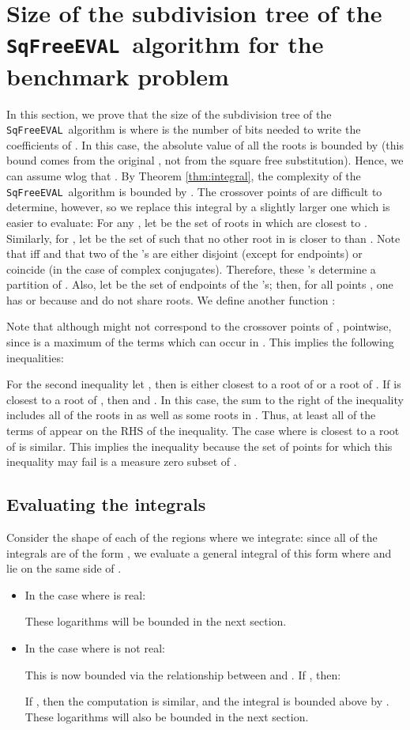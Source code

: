 \documentclass{amsart}
\theoremstyle{definition}
\newcommand{\EVAL}{\texttt{SqFreeEVAL}}
\begin{document}
\section{Size of the subdivision tree of the \EVAL\ algorithm for the benchmark problem}\label{Sec:Analysis}
In this section, we prove that the size of the subdivision tree of the \EVAL\ algorithm is  where  is the number of bits needed to write the coefficients of .  In this case, the absolute value of all the roots is bounded by  \citep{yap:algebra:bk} (this bound comes from the original , not from the square free substitution).  Hence, we can assume wlog that .  By Theorem \ref{thm:integral}, the complexity of the \EVAL\ algorithm is bounded by .  The crossover points of  are difficult to determine, however, so we replace this integral by a slightly larger one which is easier to evaluate: For any , let  be the set of roots in  which are closest to .  Similarly, for , let  be the set of  such that no other root in  is closer to  than .  Note that  iff  and that two of the 's are either disjoint (except for endpoints) or coincide (in the case of complex conjugates).  Therefore, these 's determine a partition of .  Also, let  be the set of endpoints of the 's; then, for all points , one has  or  because  and  do not share roots.  We define another function :

Note that although  might not correspond to the crossover points of , pointwise,  since  is a maximum of the terms which can occur in .  This implies the following inequalities:

For the second inequality let , then  is either closest to a root of  or a root of . If  is closest to a root of , then  and .  In this case, the sum to the right of the inequality includes all of the roots in  as well as some roots in .  Thus, at least all of the terms of  appear on the RHS of the inequality.  The case where  is closest to a root of  is similar.  This implies the inequality because the set of points for which this inequality may fail is a measure zero subset of .

\subsection{Evaluating the integrals}
Consider the shape of each of the regions where we integrate: since all of the integrals are of the form , we evaluate a general integral of this form where  and  lie on the same side of .
\begin{itemize}
\item In the case where  is real:

These logarithms will be bounded in the next section.
\item In the case where  is not real:

This is now bounded via the relationship between  and .  If , then:

If , then the computation is similar, and the integral is bounded above by .  These logarithms will also be bounded in the next section.
\end{itemize}
\end{document}
